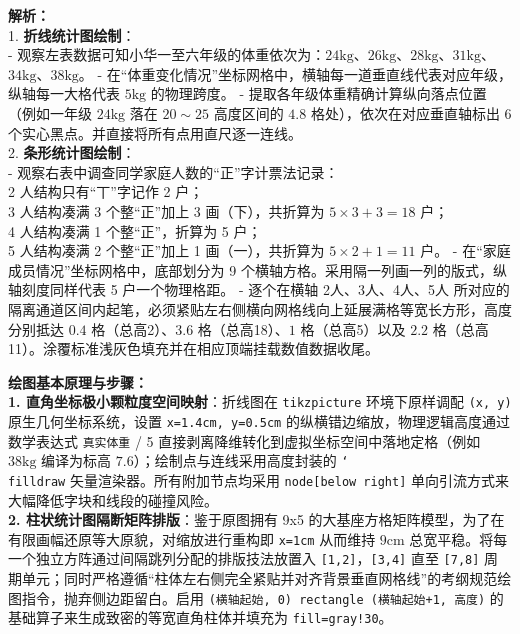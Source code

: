 \documentclass[12pt, a4paper]{ctexrep}
\begin{document}
{\small\color{gray}
\textbf{解析：}\\
1. \textbf{折线统计图绘制}：\\
- 观察左表数据可知小华一至六年级的体重依次为：$24\text{kg}$、$26\text{kg}$、$28\text{kg}$、$31\text{kg}$、$34\text{kg}$、$38\text{kg}$。
- 在“体重变化情况”坐标网格中，横轴每一道垂直线代表对应年级，纵轴每一大格代表 $5\text{kg}$ 的物理跨度。
- 提取各年级体重精确计算纵向落点位置（例如一年级 $24\text{kg}$ 落在 $20 \sim 25$ 高度区间的 $4.8$ 格处），依次在对应垂直轴标出 6 个实心黑点。并直接将所有点用直尺逐一连线。\\
2. \textbf{条形统计图绘制}：\\
- 观察右表中调查同学家庭人数的“正”字计票法记录：\\
  2 人结构只有“丅”字记作 2 户；\\
  3 人结构凑满 3 个整“正”加上 3 画（下），共折算为 $5\times3+3=18$ 户；\\
  4 人结构凑满 1 个整“正”，折算为 5 户；\\
  5 人结构凑满 2 个整“正”加上 1 画（一），共折算为 $5\times2+1=11$ 户。
- 在“家庭成员情况”坐标网格中，底部划分为 9 个横轴方格。采用隔一列画一列的版式，纵轴刻度同样代表 5 户一个物理格距。
- 逐个在横轴 2人、3人、4人、5人 所对应的隔离通道区间内起笔，必须紧贴左右侧横向网格线向上延展满格等宽长方形，高度分别抵达 $0.4$ 格（总高2）、$3.6$ 格（总高18）、$1$ 格（总高5）以及 $2.2$ 格（总高11）。涂覆标准浅灰色填充并在相应顶端挂载数值数据收尾。
}

\vspace{0.6cm}

{\small\color{blue!70!black}
\textbf{绘图基本原理与步骤：}\\
\textbf{1. 直角坐标极小颗粒度空间映射}：折线图在 \texttt{tikzpicture} 环境下原样调配 \texttt{(x, y)} 原生几何坐标系统，设置 \texttt{x=1.4cm, y=0.5cm} 的纵横错边缩放，物理逻辑高度通过数学表达式 \texttt{真实体重} / 5 直接剥离降维转化到虚拟坐标空间中落地定格（例如 $38\text{kg}$ 编译为标高 $7.6$）；绘制点与连线采用高度封装的 \texttt{\char`\\filldraw} 矢量渲染器。所有附加节点均采用 \texttt{node[below right]} 单向引流方式来大幅降低字块和线段的碰撞风险。\\
\textbf{2. 柱状统计图隔断矩阵排版}：鉴于原图拥有 9x5 的大基座方格矩阵模型，为了在有限画幅还原等大原貌，对缩放进行重构即 \texttt{x=1cm} 从而维持 $9\text{cm}$ 总宽平稳。将每一个独立方阵通过间隔跳列分配的排版技法放置入 \texttt{[1,2]}，\texttt{[3,4]} 直至 \texttt{[7,8]} 周期单元；同时严格遵循“柱体左右侧完全紧贴并对齐背景垂直网格线”的考纲规范绘图指令，抛弃侧边距留白。启用 \texttt{(横轴起始, 0) rectangle (横轴起始+1, 高度)} 的基础算子来生成致密的等宽直角柱体并填充为 \texttt{fill=gray!30}。
}
\end{document}
